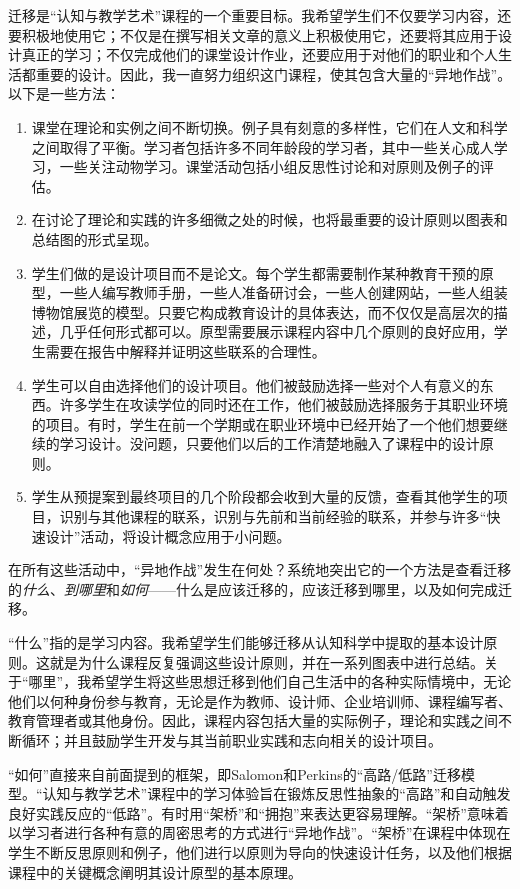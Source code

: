 迁移是“认知与教学艺术”课程的一个重要目标。我希望学生们不仅要学习内容，还要积极地使用它；不仅是在撰写相关文章的意义上积极使用它，还要将其应用于设计真正的学习；不仅完成他们的课堂设计作业，还要应用于对他们的职业和个人生活都重要的设计。因此，我一直努力组织这门课程，使其包含大量的“异地作战”。以下是一些方法：
\begin{enumerate}
    \item 课堂在理论和实例之间不断切换。例子具有刻意的多样性，它们在人文和科学之间取得了平衡。学习者包括许多不同年龄段的学习者，其中一些关心成人学习，一些关注动物学习。课堂活动包括小组反思性讨论和对原则及例子的评估。
    \item 在讨论了理论和实践的许多细微之处的时候，也将最重要的设计原则以图表和总结图的形式呈现。
    \item 学生们做的是设计项目而不是论文。每个学生都需要制作某种教育干预的原型，一些人编写教师手册，一些人准备研讨会，一些人创建网站，一些人组装博物馆展览的模型。只要它构成教育设计的具体表达，而不仅仅是高层次的描述，几乎任何形式都可以。原型需要展示课程内容中几个原则的良好应用，学生需要在报告中解释并证明这些联系的合理性。
    \item 学生可以自由选择他们的设计项目。他们被鼓励选择一些对个人有意义的东西。许多学生在攻读学位的同时还在工作，他们被鼓励选择服务于其职业环境的项目。有时，学生在前一个学期或在职业环境中已经开始了一个他们想要继续的学习设计。没问题，只要他们以后的工作清楚地融入了课程中的设计原则。
    \item 学生从预提案到最终项目的几个阶段都会收到大量的反馈，查看其他学生的项目，识别与其他课程的联系，识别与先前和当前经验的联系，并参与许多“快速设计”活动，将设计概念应用于小问题。
\end{enumerate}

在所有这些活动中，“异地作战”发生在何处？系统地突出它的一个方法是查看迁移的\textit{什么}、\textit{到哪里}和\textit{如何}——什么是应该迁移的，应该迁移到哪里，以及如何完成迁移。

“什么”指的是学习内容。我希望学生们能够迁移从认知科学中提取的基本设计原则。这就是为什么课程反复强调这些设计原则，并在一系列图表中进行总结。关于“哪里”，我希望学生将这些思想迁移到他们自己生活中的各种实际情境中，无论他们以何种身份参与教育，无论是作为教师、设计师、企业培训师、课程编写者、教育管理者或其他身份。因此，课程内容包括大量的实际例子，理论和实践之间不断循环；并且鼓励学生开发与其当前职业实践和志向相关的设计项目。

“如何”直接来自前面提到的框架，即Salomon和Perkins的“高路/低路”迁移模型。“认知与教学艺术”课程中的学习体验旨在锻炼反思性抽象的“高路”和自动触发良好实践反应的“低路”。有时用“架桥”和“拥抱”来表达更容易理解。“架桥”意味着以学习者进行各种有意的周密思考的方式进行“异地作战”。“架桥”在课程中体现在学生不断反思原则和例子，他们进行以原则为导向的快速设计任务，以及他们根据课程中的关键概念阐明其设计原型的基本原理。

